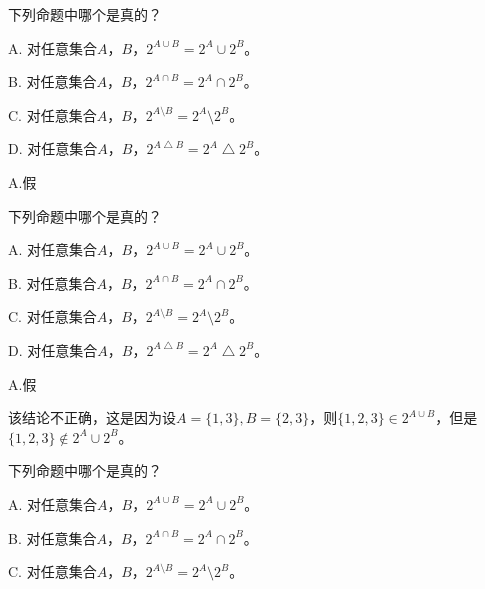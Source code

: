 \documentclass{beamer}
\begin{document}
\begin{CJK*}{UTF8}{gbsn}
\begin{frame}
\begin{Exercise}
  下列命题中哪个是真的？

A. 对任意集合$A$，$B$，$2^{A\cup B} = 2^A \cup 2^B$。

B. 对任意集合$A$，$B$，$2^{A\cap B} = 2^A \cap 2^B$。

C. 对任意集合$A$，$B$，$2^{A\setminus B} = 2^A \setminus 2^B$。

D. 对任意集合$A$，$B$，$2^{A\bigtriangleup B} = 2^A \bigtriangleup 2^B$。

\end{Exercise}
\pause
A.假
\begin{center}
\end{center}
\end{frame}

\begin{frame}
\begin{Exercise}
  下列命题中哪个是真的？

A. 对任意集合$A$，$B$，$2^{A\cup B} = 2^A \cup 2^B$。

B. 对任意集合$A$，$B$，$2^{A\cap B} = 2^A \cap 2^B$。

C. 对任意集合$A$，$B$，$2^{A\setminus B} = 2^A \setminus 2^B$。

D. 对任意集合$A$，$B$，$2^{A\bigtriangleup B} = 2^A \bigtriangleup 2^B$。

\end{Exercise}
\pause
A.假

该结论不正确，这是因为设$A=\{1,3\},B=\{2,3\}$，则$\{1,2,3\}\in 2^{A\cup B}$，但是$\{1,2,3\}\notin 2^{A}\cup 2^{B}$。
\end{frame}

\begin{frame}
\begin{Exercise}
  下列命题中哪个是真的？

A. 对任意集合$A$，$B$，$2^{A\cup B} = 2^A \cup 2^B$。

B. 对任意集合$A$，$B$，$2^{A\cap B} = 2^A \cap 2^B$。

C. 对任意集合$A$，$B$，$2^{A\setminus B} = 2^A \setminus 2^B$。


\end{Exercise}
\end{frame}
\end{CJK*}
\end{document}
